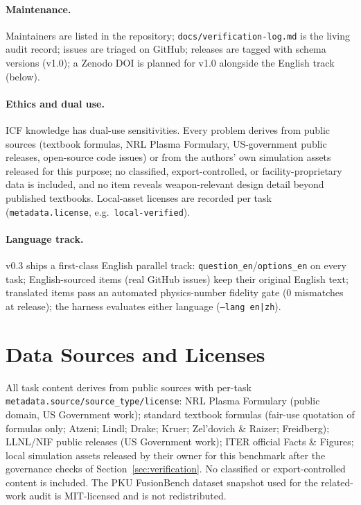 \paragraph{Maintenance.} Maintainers are listed in the repository; \texttt{docs/verification-log.md} is the living audit record; issues are triaged on GitHub; releases are tagged with schema versions (v1.0); a Zenodo DOI is planned for v1.0 alongside the English track (below).

\paragraph{Ethics and dual use.} ICF knowledge has dual-use sensitivities. Every problem derives from public sources (textbook formulas, NRL Plasma Formulary, US-government public releases, open-source code issues) or from the authors' own simulation assets released for this purpose; no classified, export-controlled, or facility-proprietary data is included, and no item reveals weapon-relevant design detail beyond published textbooks. Local-asset licenses are recorded per task (\texttt{metadata.license}, e.g.\ \texttt{local-verified}).

\paragraph{Language track.} v0.3 ships a first-class English parallel track: \texttt{question\_en}/\texttt{options\_en} on every task; English-sourced items (real GitHub issues) keep their original English text; translated items pass an automated physics-number fidelity gate (0 mismatches at release); the harness evaluates either language (\texttt{--lang en|zh}).

\section{Data Sources and Licenses}
\label{app:sources}
All task content derives from public sources with per-task \texttt{metadata.source/source\_type/license}: NRL Plasma Formulary (public domain, US Government work); standard textbook formulas (fair-use quotation of formulas only; Atzeni; Lindl; Drake; Kruer; Zel'dovich \& Raizer; Freidberg); LLNL/NIF public releases (US Government work); ITER official Facts \& Figures; local simulation assets released by their owner for this benchmark after the governance checks of Section~\ref{sec:verification}. No classified or export-controlled content is included. The PKU FusionBench dataset snapshot used for the related-work audit is MIT-licensed and is not redistributed.

